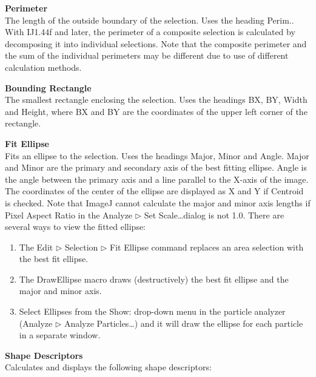 \textbf{Perimeter}\\The length of the outside boundary of the
selection. Uses the heading Perim.. With IJ1.44f and
later, the perimeter of a composite selection is calculated by
decomposing it into individual selections. Note that the composite
perimeter and the sum of the individual perimeters may be different due
to use of different calculation methods.

\textbf{Bounding Rectangle}\\The smallest rectangle enclosing the
selection. Uses the headings BX, BY, Width and Height, where BX and BY
are the coordinates of the upper left corner of the rectangle.

\textbf{Fit Ellipse}\\ Fits an ellipse to the selection. Uses the
headings Major, Minor and Angle. Major and Minor are the primary and
secondary axis of the best fitting ellipse. Angle is the angle between
the primary axis and a line parallel to the X-axis of the image. The
coordinates of the center of the ellipse are displayed as X and Y if
Centroid is checked. Note that ImageJ cannot calculate the major and
minor axis lengths if Pixel Aspect Ratio in the Analyze
${\triangleright}$ Set Scale\ldots dialog is not 1.0. There are
several ways to view the fitted ellipse:
\begin{enumerate}
\item The Edit ${\triangleright}$ Selection ${\triangleright}$ Fit
Ellipse command replaces an area selection with the best fit
ellipse.

\item The DrawEllipse macro draws (destructively) the best fit ellipse and
the major and minor axis.

\item Select Ellipses from the Show: drop-down menu in the particle
analyzer (Analyze ${\triangleright}$ Analyze Particles\ldots) and it
will draw the ellipse for each particle in a separate window.
\end{enumerate}

\textbf{Shape Descriptors}\\Calculates and displays the following
shape descriptors:

